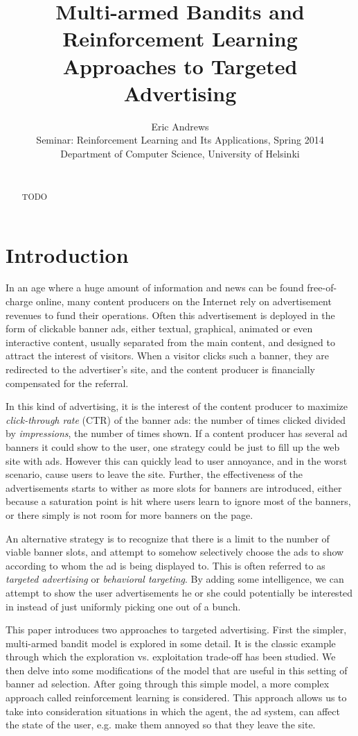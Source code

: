 \documentclass{article} %
\title{Multi-armed Bandits and Reinforcement Learning Approaches to Targeted
Advertising}
\author{
Eric Andrews \\
Seminar: Reinforcement Learning and Its Applications, Spring 2014 \\
Department of Computer Science, University of Helsinki\\\\
}
\begin{document}
\maketitle

\begin{abstract}
  TODO
\end{abstract}

\section{Introduction}

In an age where a huge amount of information and news can be found
free-of-charge online, many content producers on the Internet rely on
advertisement revenues to fund their operations. Often this advertisement is
deployed in the form of clickable banner ads, either textual, graphical,
animated or even interactive content, usually separated from the main content,
and designed to attract the interest of visitors. When a visitor clicks such a
banner, they are redirected to the advertiser's site, and the content producer
is financially compensated for the referral.

In this kind of advertising, it is the interest of the content producer to
maximize \emph{click-through rate} (CTR) of the banner ads: the number of times
clicked divided by \emph{impressions}, the number of times shown. If a content
producer has several ad banners it could show to the user, one strategy could
be just to fill up the web site with ads. However this can quickly lead to user
annoyance, and in the worst scenario, cause users to leave the site. Further,
the effectiveness of the advertisements starts to wither as more slots for
banners are introduced, either because a saturation point is hit where users
learn to ignore most of the banners, or there simply is not room for more
banners on the page.

An alternative strategy is to recognize that there is a limit to the number of
viable banner slots, and attempt to somehow selectively choose the ads to show
according to whom the ad is being displayed to. This is often referred to as
\emph{targeted advertising} or \emph{behavioral targeting}. By adding some
intelligence, we can attempt to show the user advertisements he or she could
potentially be interested in instead of just uniformly picking one out of a
bunch.

This paper introduces two approaches to targeted advertising. First the
simpler, multi-armed bandit model is explored in some detail. It is the classic
example through which the exploration vs.  exploitation trade-off has been
studied. We then delve into some modifications of the model that are useful in
this setting of banner ad selection. After going through this simple model, a
more complex approach called reinforcement learning is considered. This
approach allows us to take into consideration situations in which the agent,
the ad system, can affect the state of the user, e.g. make them annoyed so that
they leave the site.
\end{document}
